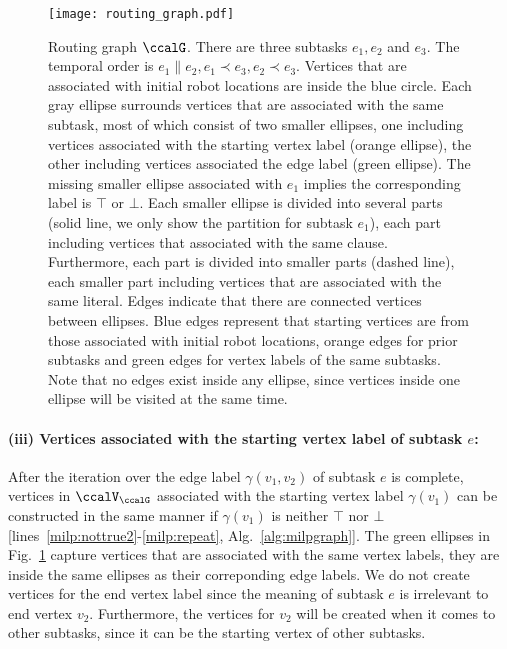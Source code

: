 \documentclass[Afour,sageh,times]{sagej}
\begin{document}
\begin{figure}[!t]
  \centering
  \texttt{[image: routing\_graph.pdf]}
  \caption{Routing graph $\ccalG$. There are three subtasks $e_1, e_2$ and $e_3$. The temporal order is $e_1 \| e_2, e_1 \prec e_3, e_2 \prec e_3$.    Vertices that are associated with initial robot locations are inside the blue circle. Each gray ellipse surrounds vertices that are associated with the same subtask, most of which consist of two smaller ellipses, one including vertices associated with the starting vertex label (orange ellipse), the other including vertices associated the edge label (green ellipse). The missing smaller ellipse associated with $e_1$ implies the corresponding label is $\top$ or $\bot$. Each smaller ellipse is divided into several parts (solid line, we only show the partition for subtask $e_1$), each part including vertices that associated with the same clause. Furthermore, each part is divided into smaller parts (dashed line), each smaller part including vertices that are associated with the same literal. Edges indicate that there are connected vertices between  ellipses. Blue edges represent that starting vertices are from those associated with initial robot locations, orange  edges for prior subtasks and green edges for vertex labels of the same subtasks. Note that no edges exist inside any ellipse, since vertices inside one ellipse will be visited at the same time.}
  \label{fig:routing}
\end{figure}
\paragraph{(iii) Vertices associated with the starting vertex label of subtask $e$:} After the iteration over the edge label $\gamma(v_1, v_2)$ of subtask $e$ is complete, vertices in $\ccalV_\ccalG$ associated with the starting  vertex label $\gamma(v_1)$ can be constructed in the same manner if $\gamma(v_1)$ is neither $\top$ nor $\bot$ [lines~\ref{milp:nottrue2}-\ref{milp:repeat}, Alg.~\ref{alg:milpgraph}]. The green ellipses in Fig.~\ref{fig:routing} capture vertices that are associated with the same vertex labels, they are inside the same ellipses as their correponding edge labels. We do not create vertices for the end vertex label since the meaning of subtask $e$ is irrelevant to end vertex $v_2$. Furthermore, the vertices for $v_2$ will be created when it comes to other subtasks, since it can be the starting vertex of other subtasks.
\end{document}
